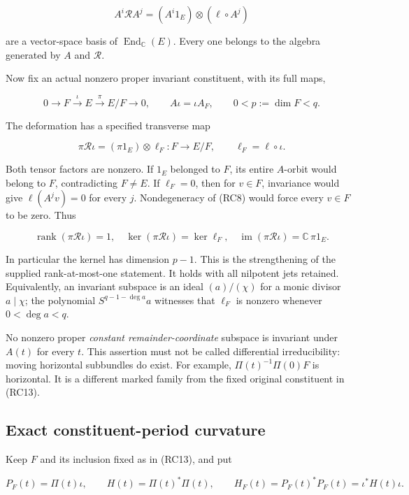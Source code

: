 \[
A^i\mathcal R A^j=(A^i1_E)\otimes(\ell\circ A^j)
\tag{RC12}
\]

are a vector-space basis of \(\operatorname{End}_{\mathbb C}(E)\). Every one belongs to the algebra generated by \(A\) and \(\mathcal R\).

Now fix an actual nonzero proper invariant constituent, with its full maps,

\[
0\longrightarrow F\xrightarrow{\iota}E
\xrightarrow{\pi}E/F\longrightarrow0,
\qquad A\iota=\iota A_F,
\qquad 0<p:=\dim F<q.
\tag{RC13}
\]

The deformation has a specified transverse map

\[
\boxed{\pi\mathcal R\iota
=(\pi1_E)\otimes\ell_F:F\longrightarrow E/F,
\qquad \ell_F=\ell\circ\iota.}
\tag{RC14}
\]

Both tensor factors are nonzero. If \(1_E\) belonged to \(F\), its entire \(A\)-orbit would belong to \(F\), contradicting \(F\ne E\). If \(\ell_F=0\), then for \(v\in F\), invariance would give \(\ell(A^jv)=0\) for every \(j\). Nondegeneracy of (RC8) would force every \(v\in F\) to be zero. Thus

\[
\boxed{\operatorname{rank}(\pi\mathcal R\iota)=1,
\quad \ker(\pi\mathcal R\iota)=\ker\ell_F,
\quad \operatorname{im}(\pi\mathcal R\iota)=\mathbb C\,\pi1_E.}
\tag{RC15}
\]

In particular the kernel has dimension \(p-1\). This is the strengthening of the supplied rank-at-most-one statement. It holds with all nilpotent jets retained. Equivalently, an invariant subspace is an ideal \((a)/(\chi)\) for a monic divisor \(a\mid\chi\); the polynomial \(S^{q-1-\deg a}a\) witnesses that \(\ell_F\) is nonzero whenever \(0<\deg a<q\).

No nonzero proper \emph{constant remainder-coordinate} subspace is invariant under \(A(t)\) for every \(t\). This assertion must not be called differential irreducibility: moving horizontal subbundles do exist. For example, \(\Pi(t)^{-1}\Pi(0)F\) is horizontal. It is a different marked family from the fixed original constituent in (RC13).

\subsection{Exact constituent-period curvature}\label{endpoint-residue_original--exact-constituent-period-curvature}

Keep \(F\) and its inclusion fixed as in (RC13), and put

\[
P_F(t)=\Pi(t)\iota,\qquad
H(t)=\Pi(t)^*\Pi(t),\qquad
H_F(t)=P_F(t)^*P_F(t)=\iota^*H(t)\iota.
\tag{RC16}
\]

